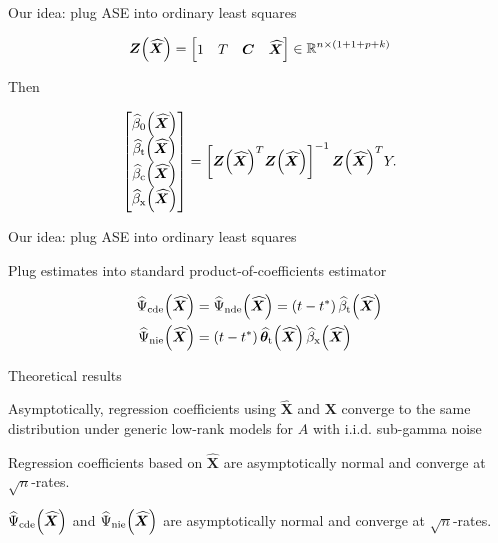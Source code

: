 \documentclass{beamer}
\theoremstyle{remark}
\newcommand{\C}{\bm C}
\newcommand{\X}{\bm X}
\newcommand{\Z}{\bm Z}
\newcommand{\Xhat}{\widehat{\X}}
\newcommand \R {\mathbb{R}}
\newcommand \thetathat [1] {\widehat{\bm \theta}_\text{t} \paren*{#1}}
\newcommand \betazerohat [1] {\widehat{\beta}_0 \paren*{#1}}
\newcommand \betathat [1] {\widehat{\beta}_\text{t} \paren*{#1}}
\newcommand \betachat [1] {\widehat{\beta}_\text{c} \paren*{#1}}
\newcommand \betaxhat [1] {\widehat{\beta}_\text{x} \paren*{#1}}
\newcommand \cdehat [1] {\widehat{\Psi}_\text{cde} \paren*{#1}}
\newcommand \ndehat [1] {\widehat{\Psi}_\text{nde} \paren*{#1}}
\newcommand \niehat [1] {\widehat{\Psi}_\text{nie} \paren*{#1}}
\DeclarePairedDelimiter{\paren}{(}{)}
\begin{document}
\begin{frame}{Our idea: plug ASE into ordinary least squares}

    \begin{align*}
        \Z \paren*{\Xhat} = \begin{bmatrix}
            1 & T & \C & \Xhat \\
        \end{bmatrix} \in \R^{n \times (1 + 1 + p + k)}
    \end{align*}

    Then

    \begin{align*}
        \begin{bmatrix}
            \betazerohat{\Xhat} \\
            \betathat{\Xhat}    \\
            \betachat{\Xhat}    \\
            \betaxhat{\Xhat}
        \end{bmatrix}
        = \left[ \Z \paren*{\Xhat}^T  \Z \paren*{\Xhat} \right]^{-1} \Z \paren*{\Xhat}^T Y.
    \end{align*}
\end{frame}

\begin{frame}{Our idea: plug ASE into ordinary least squares}

    Plug estimates into standard product-of-coefficients estimator

    \begin{align*}
        \cdehat{\Xhat} & = \ndehat{\Xhat} = \paren*{t - t^*} \, \betathat{\Xhat}     \\
        \niehat{\Xhat} & = \paren*{t - t^*} \, \thetathat{\Xhat} \, \betaxhat{\Xhat}
    \end{align*}

\end{frame}

\begin{frame}{Theoretical results}
    \begin{theorem}[informal]
        Asymptotically, regression coefficients using $\Xhat$ and $\X$ converge to the same distribution under generic low-rank models for $A$ with i.i.d. sub-gamma noise
    \end{theorem}

    \begin{corollary}[informal]
        Regression coefficients based on $\Xhat$ are asymptotically normal and converge at $\sqrt n$-rates.
    \end{corollary}

    \begin{corollary}[informal]
        $\cdehat{\Xhat}$ and $\niehat{\Xhat}$ are asymptotically normal and converge at $\sqrt n$-rates.
    \end{corollary}
\end{frame}
\end{document}
